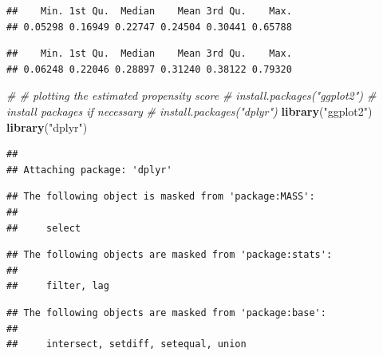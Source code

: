 \documentclass[
  10pt,
]{book}
\newenvironment{Shaded}{\begin{snugshade}}{\end{snugshade}}
\newcommand{\CommentTok}[1]{\textcolor[rgb]{0.56,0.35,0.01}{\textit{#1}}}
\newcommand{\DecValTok}[1]{\textcolor[rgb]{0.00,0.00,0.81}{#1}}
\newcommand{\KeywordTok}[1]{\textcolor[rgb]{0.13,0.29,0.53}{\textbf{#1}}}
\newcommand{\NormalTok}[1]{#1}
\newcommand{\OperatorTok}[1]{\textcolor[rgb]{0.81,0.36,0.00}{\textbf{#1}}}
\newcommand{\StringTok}[1]{\textcolor[rgb]{0.31,0.60,0.02}{#1}}
\begin{document}
\begin{verbatim}
##    Min. 1st Qu.  Median    Mean 3rd Qu.    Max. 
## 0.05298 0.16949 0.22747 0.24504 0.30441 0.65788
\end{verbatim}

\begin{Shaded}
\end{Shaded}

\begin{verbatim}
##    Min. 1st Qu.  Median    Mean 3rd Qu.    Max. 
## 0.06248 0.22046 0.28897 0.31240 0.38122 0.79320
\end{verbatim}

\begin{Shaded}
\begin{Highlighting}[]
\CommentTok{\# \# plotting the estimated propensity score}
\CommentTok{\# install.packages("ggplot2") \# install packages if necessary}
\CommentTok{\# install.packages("dplyr")}
\KeywordTok{library}\NormalTok{(}\StringTok{"ggplot2"}\NormalTok{)}
\KeywordTok{library}\NormalTok{(}\StringTok{"dplyr"}\NormalTok{)}
\end{Highlighting}
\end{Shaded}

\begin{verbatim}
## 
## Attaching package: 'dplyr'
\end{verbatim}

\begin{verbatim}
## The following object is masked from 'package:MASS':
## 
##     select
\end{verbatim}

\begin{verbatim}
## The following objects are masked from 'package:stats':
## 
##     filter, lag
\end{verbatim}

\begin{verbatim}
## The following objects are masked from 'package:base':
## 
##     intersect, setdiff, setequal, union
\end{verbatim}
\end{document}
